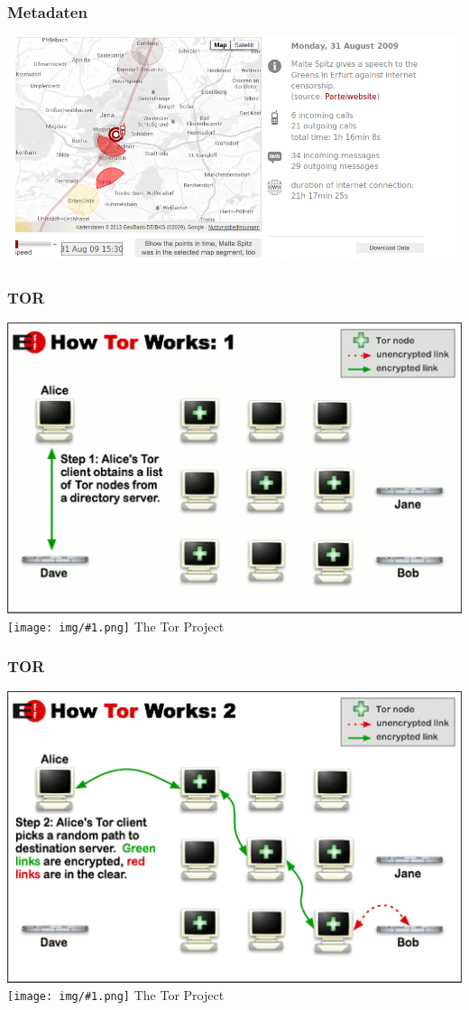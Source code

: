 \documentclass[12pt]{beamer}
\newcommand{\cc}[1]{\texttt{[image: img/\#1.png]}\hspace{1mm}}
\begin{document}
\begin{frame}
    \frametitle{Metadaten}
    \includegraphics[height=0.7\textheight]{img/maltespitz.png}
\end{frame}

\begin{frame}
    \frametitle{TOR}
    \includegraphics[height=0.7\textheight]{img/tor1.png}
    \\{\small \cc{by} The Tor Project}
\end{frame}

\begin{frame}
    \frametitle{TOR}
    \includegraphics[height=0.7\textheight]{img/tor2.png}
    \\{\small \cc{by} The Tor Project}
\end{frame}
\end{document}
